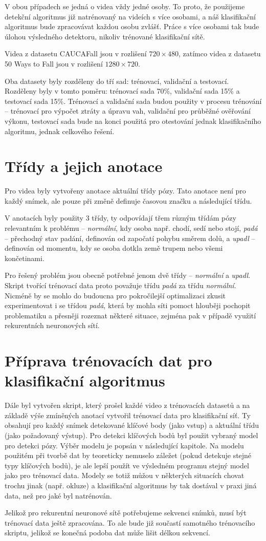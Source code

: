 V obou případech se jedná o videa vždy jedné osoby. To proto, že použijeme
detekční algoritmus již natrénovaný na videích s více osobami, a náš
klasifikační algoritmus bude zpracovávat každou osobu zvlášť. Práce s více
osobami tak bude úlohou výsledného detektoru, nikoliv trénované klasifikační
sítě.

Videa z datasetu CAUCAFall jsou v rozlišení $720\times480$, zatímco videa z
datasetu 50 Ways to Fall jsou v rozlišení $1280\times720$.

Oba datasety byly rozděleny do tří sad: trénovací, validační a testovací.
Rozděleny byly v tomto poměru: trénovací sada 70\%, validační sada 15\% a
testovací sada 15\%. Trénovací a validační sada budou použity v procesu
trénování – trénovací pro výpočet ztráty a úpravu vah, validační pro průběžné
ověřování výkonu, testovací sada bude na konci použitá pro otestování jednak
klasifikačního algoritmu, jednak celkového řešení.

\section{Třídy a jejich anotace}
Pro videa byly vytvořeny anotace aktuální třídy pózy. Tato anotace není pro
každý snímek, ale pouze při změně definuje časovou značku a následující třídu.

V anotacích byly použity 3 třídy, ty odpovídají třem různým třídám pózy
relevantním k problému – \textit{normální}, kdy osoba např. chodí, sedí nebo
stojí, \textit{padá} – přechodný stav padání, definován od započatí pohybu
směrem dolů, a \textit{upadl} – definován od momentu, kdy se osoba dotkla země
trupem nebo všemi končetinami.

Pro řešený problém jsou obecně potřebné jenom dvě třídy – \textit{normální} a
\textit{upadl}. Skript tvořící trénovací data proto považuje třídu
\textit{padá} za třídu \textit{normální}. Nicméně by se mohlo do budoucna pro
pokročilejší optimalizaci zkusit experimentovat i se třídou \textit{padá},
která by mohla síti pomoct hlouběji pochopit problematiku a přesněji rozeznat
některé situace, zejména pak v případě využití rekurentních neuronových sítí.

\section{Příprava trénovacích dat pro klasifikační algoritmus}

Dále byl vytvořen skript, který prošel každé video z trénovacích datasetů a na
základě výše zmíněných anotací vytvořil trénovací data pro klasifikační
síť. Ty obsahují pro každý snímek detekované klíčové body (jako vstup) a
aktuální třídu (jako požadovaný výstup). Pro detekci klíčových bodů byl použit
vybraný model pro detekci pózy. Výběr modelu je popsán v následující kapitole.
Na modelu použitém při tvorbě dat by teoreticky nemuselo záležet (pokud detekuje stejné typy
klíčových bodů), je ale lepší použít ve výsledném programu stejný model jako
pro trénovací data. Modely se totiž můžou v některých situacích chovat trochu
jinak (např. okluze) a klasifikační algoritmus by tak dostával v praxi jiná data, než pro
jaké byl natrénován.

Jelikož pro rekurentní neuronové sítě potřebujeme sekvenci snímků, musí být
trénovací data ještě zpracována. To ale bude již součastí samotného trénovacího
skriptu, jelikož se konečná podoba dat může lišit délkou sekvencí.
\endinput